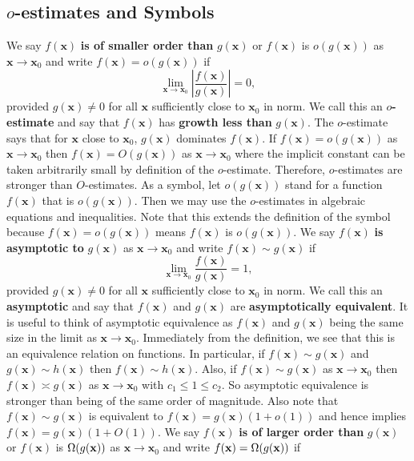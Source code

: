     \subsection*{\texorpdfstring{$o$}{o}-estimates and Symbols}
      We say $f(\mathbf{x})$ \textbf{is of smaller order than} $g(\mathbf{x})$ or $f(\mathbf{x})$ is $o(g(\mathbf{x}))$ as $\mathbf{x} \to \mathbf{x}_{0}$ and write $f(\mathbf{x}) = o(g(\mathbf{x}))$ if
      \[
        \lim_{\mathbf{x} \to \mathbf{x}_{0}}\left|\frac{f(\mathbf{x})}{g(\mathbf{x})}\right| = 0,
      \]
      provided $g(\mathbf{x}) \neq 0$ for all $\mathbf{x}$ sufficiently close to $\mathbf{x}_{0}$ in norm. We call this an \textbf{$o$-estimate} and say that $f(\mathbf{x})$ has \textbf{growth less than} $g(\mathbf{x})$. The $o$-estimate says that for $\mathbf{x}$ close to $\mathbf{x}_{0}$, $g(\mathbf{x})$ dominates $f(\mathbf{x})$. If $f(\mathbf{x}) = o(g(\mathbf{x}))$ as $\mathbf{x} \to \mathbf{x}_{0}$ then $f(\mathbf{x}) = O(g(\mathbf{x}))$ as $\mathbf{x} \to \mathbf{x}_{0}$ where the implicit constant can be taken arbitrarily small by definition of the $o$-estimate. Therefore, $o$-estimates are stronger than $O$-estimates. As a symbol, let $o(g(\mathbf{x}))$ stand for a function $f(\mathbf{x})$ that is $o(g(\mathbf{x}))$. Then we may use the $o$-estimates in algebraic equations and inequalities. Note that this extends the definition of the symbol because $f(\mathbf{x}) = o(g(\mathbf{x}))$ means $f(\mathbf{x})$ is $o(g(\mathbf{x}))$. We say $f(\mathbf{x})$ \textbf{is asymptotic to} $g(\mathbf{x})$ as $\mathbf{x} \to \mathbf{x}_{0}$ and write $f(\mathbf{x}) \sim g(\mathbf{x})$ if
      \[
        \lim_{\mathbf{x} \to \mathbf{x}_{0}}\frac{f(\mathbf{x})}{g(\mathbf{x})} = 1,
      \]
      provided $g(\mathbf{x}) \neq 0$ for all $\mathbf{x}$ sufficiently close to $\mathbf{x}_{0}$ in norm. We call this an \textbf{asymptotic} and say that $f(\mathbf{x})$ and $g(\mathbf{x})$ are \textbf{asymptotically equivalent}. It is useful to think of asymptotic equivalence as $f(\mathbf{x})$ and $g(\mathbf{x})$ being the same size in the limit as $\mathbf{x} \to \mathbf{x}_{0}$. Immediately from the definition, we see that this is an equivalence relation on functions. In particular, if $f(\mathbf{x}) \sim g(\mathbf{x})$ and $g(\mathbf{x}) \sim h(\mathbf{x})$ then $f(\mathbf{x}) \sim h(\mathbf{x})$. Also, if $f(\mathbf{x}) \sim g(\mathbf{x})$ as $\mathbf{x} \to \mathbf{x}_{0}$ then $f(\mathbf{x}) \asymp g(\mathbf{x})$ as $\mathbf{x} \to \mathbf{x}_{0}$ with $c_{1} \le 1 \le c_{2}$. So asymptotic equivalence is stronger than being of the same order of magnitude. Also note that $f(\mathbf{x}) \sim g(\mathbf{x})$ is equivalent to $f(\mathbf{x}) = g(\mathbf{x})(1+o(1))$ and hence implies $f(\mathbf{x}) = g(\mathbf{x})(1+O(1))$. We say $f(\mathbf{x})$ \textbf{is of larger order than} $g(\mathbf{x})$ or $f(\mathbf{x})$ is $\Omega(g(\mathbf{x}))$ as $\mathbf{x} \to \mathbf{x}_{0}$ and write $f(\mathbf{x}) = \Omega(g(\mathbf{x}))$ if
